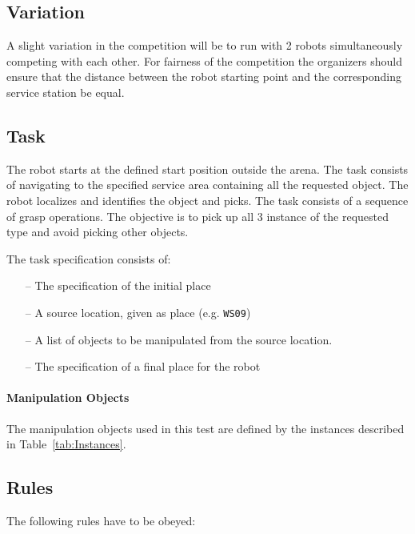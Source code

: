 \subsection{Variation}
A slight variation in the competition will be to run with 2 robots simultaneously competing with each other.
For fairness of the competition the organizers should ensure that the distance between the robot starting
point and the corresponding service station be equal.

\subsection{Task}
The robot starts at the defined start position outside the arena.
The task consists of navigating to the specified service area containing all the
requested object. The robot localizes and identifies the object and picks.
The task consists of a sequence of grasp operations. The objective is to pick up all 3 instance of the requested type and avoid picking other objects.
\par
The task specification consists of:
\begin{itemize}
	\item[--] The specification of the initial place
	\item[--] A source location, given as place (e.g. \texttt{WS09})
	\item[--] A list of objects to be manipulated from the source location.
	\item[--] The specification of a final place for the robot
\end{itemize}

\paragraph{Manipulation Objects}
The manipulation objects used in this test are defined by the instances described in Table~\ref{tab:Instances}.

\subsection{Rules}
The following rules have to be obeyed:

